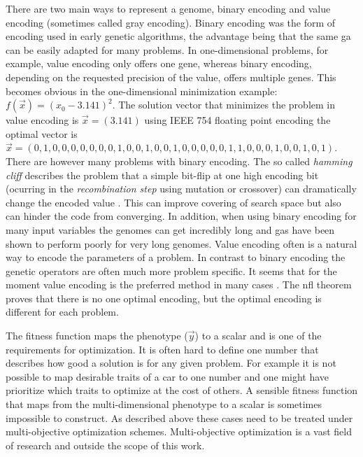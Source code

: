 There are two main ways to represent a \gls{genome}, binary encoding and value encoding (sometimes called gray encoding). Binary encoding was the form of encoding  used in early genetic algorithms, the advantage being that the same \gls{ga} can be easily adapted for many problems. In one-dimensional problems, for example, value encoding only offers one gene, whereas binary encoding, depending on the requested precision of the value, offers multiple genes. This becomes obvious in the one-dimensional minimization example: $f(\vec{x})=(x_0 - 3.141)^2$. The solution vector that minimizes the problem in value encoding is $\vec{x} = (3.141)$ using IEEE 754 floating point encoding the optimal vector is $\vec{x}=(0,1,0,0,0,0,0,0,0,1,0,0,1,0,0,1,0,0,0,0,0,1,1,0,0,0,1,0,0,1,0,1)$.
There are however many problems with binary encoding. The so called \textit{hamming cliff} describes the problem that a simple bit-flip at one high encoding bit (ocurring in the \textit{recombination step} using \gls{mutation} or \gls{crossover}) can dramatically change the encoded value \citep[e.g.][]{Chakraborty2003253}. This can improve covering of search space but also can hinder the code from converging. In addition, when using binary encoding for many input variables the genomes can get incredibly long and \glspl{ga} have been shown to perform poorly for very long genomes. Value encoding often is a natural way to encode the parameters of a problem. In contrast to binary encoding the genetic operators are often much more problem specific. It seems that for the moment value encoding is the preferred method in many cases \citep[e.g.][]{Janikow1991Comparison,Wright91geneticalgorithms,Goldberg90real-codedgenetic}. The \gls{nfl} theorem proves that there is no one optimal encoding, but the optimal encoding is different for each problem.

The fitness function maps the phenotype ($\vec{y}$) to a scalar and is one of the requirements for optimization. It is often hard to define one number that describes how good a solution is for any given problem. For example it is not possible to map desirable traits of a car to one number and one might have prioritize which traits to optimize at the cost of others. A sensible \gls{fitness} function that maps from the multi-dimensional \gls{phenotype} to a scalar is sometimes impossible to construct. As described above these cases need to be treated under multi-objective optimization schemes. Multi-objective optimization is a vast field of research and outside the scope of this work. 

